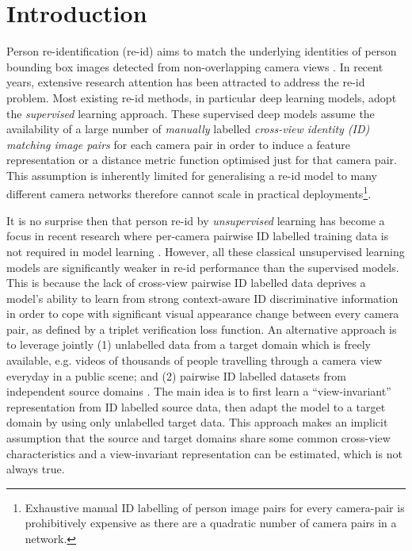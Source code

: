 \documentclass[runningheads]{llncs}
\begin{document}
\section{Introduction}
Person re-identification (re-id) aims to match the underlying identities 
of person bounding box images detected from
non-overlapping camera views \cite{gong2014person}.
In recent years, 
extensive research attention has been attracted
\cite{li2014deepreid,cheng2016person,ahmed2015improved,subramaniam2016deep,xiao2016learning,wang2016joint,li2017person,chen2017beyond,cho2016improving,hermans2017defense,zhang2017deep,li2018harmonious,farenzena2010person}
to address the re-id problem. 
Most existing re-id methods, in particular deep learning models,
adopt the {\em supervised} learning approach. 
These supervised deep models assume the availability of a large number of {\em manually}
labelled {\em cross-view identity (ID) matching image pairs} for each 
camera pair 
in order to induce a feature representation or a
distance metric function optimised just for that camera pair.
This assumption is inherently limited for generalising a re-id model
to many different camera networks therefore cannot scale in practical
deployments\footnote{Exhaustive manual ID labelling of person image pairs 
for every camera-pair is prohibitively 
expensive as there are a quadratic number of camera pairs in a network.}.

It is no surprise then that person re-id by {\em unsupervised} learning has become
a focus in recent research where per-camera pairwise ID labelled
training data is not required in model learning
\cite{wang2014unsupervised,kodirov2015dictionary,lisanti2015person,kodirov2016person,khan2016unsupervised,wang2016towards,ma2017person,ye2017dynamic,liu2017stepwise,zhao2017person}. 
However, all these classical unsupervised learning models are
significantly weaker in re-id performance than the supervised models.
This is because the lack of cross-view pairwise ID labelled data deprives
a model's ability to learn from strong context-aware ID discriminative
information in order to cope with significant visual appearance change
between every camera pair, as defined by a triplet verification loss function.
An alternative approach is to leverage jointly
{(1)} unlabelled data from a target domain which is freely available,
e.g. videos of thousands of people travelling through a camera view everyday in a public scene;
and 
{(2)} pairwise ID labelled datasets from independent source domains
\cite{want2018Transfer,peng2016unsupervised,fan2017unsupervised,yu2017cross,su2016deep}. 
The main idea is to first learn
a ``view-invariant'' representation from ID labelled source data,
then adapt the model to a target domain by using only unlabelled
target data. This approach makes an implicit assumption that
the source and target domains share some common cross-view
characteristics and a view-invariant representation can be estimated, which is not always true. 
\end{document}
